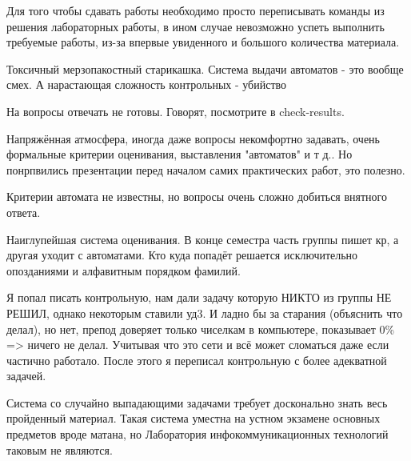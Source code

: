            \begin{commentbox} 
                Для того чтобы сдавать работы необходимо просто переписывать команды из решения лабораторных работы, в ином случае невозможно успеть выполнить требуемые работы, из-за впервые увиденного и большого количества материала. 
            \end{commentbox} 
        
            \begin{commentbox} 
                Токсичный мерзопакостный старикашка. Система выдачи автоматов - это вообще смех. А нарастающая сложность контрольных - убийство 
            \end{commentbox} 
        
            \begin{commentbox} 
                На вопросы отвечать не готовы. Говорят, посмотрите в check-results. 
            \end{commentbox} 
        
            \begin{commentbox} 
                Напряжённая атмосфера, иногда даже вопросы некомфортно задавать, очень формальные критерии оценивания, выставления "автоматов" и т д.. Но понрпвились презентации перед началом самих практических работ, это полезно. 
            \end{commentbox} 
        
            \begin{commentbox} 
                Критерии автомата не известны, но вопросы очень сложно добиться внятного ответа. 
            \end{commentbox} 
        
            \begin{commentbox} 
                Наиглупейшая система оценивания. В конце семестра часть группы пишет кр, а другая уходит с автоматами. Кто куда попадёт решается исключительно опозданиями и алфавитным порядком фамилий. 
        
                Я попал писать контрольную, нам дали задачу которую НИКТО из группы НЕ РЕШИЛ, однако некоторым ставили уд3. И ладно бы за старания (объяснить что делал), но нет, препод доверяет только чиселкам в компьютере, показывает 0\% => ничего не делал. Учитывая что это сети и всё может сломаться даже если частично работало.
                После этого я переписал контрольную с более адекватной задачей.
        
                Система со случайно выпадающими задачами требует досконально знать весь пройденный материал. Такая система уместна на устном экзамене основных предметов вроде матана, но Лаборатория инфокоммуникационных технологий таковым не являются. 
            \end{commentbox} 
        
